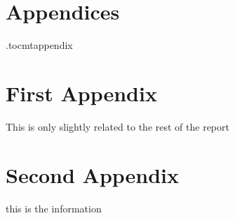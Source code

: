 \newpage
\section*{Appendices}
\appendix
\newpage
\etocdepthtag.toc{mtappendix}
\tableofcontents
\newpage


\section{First Appendix}
This is only slightly related to the rest of the report


\section{Second Appendix}
this is the information

